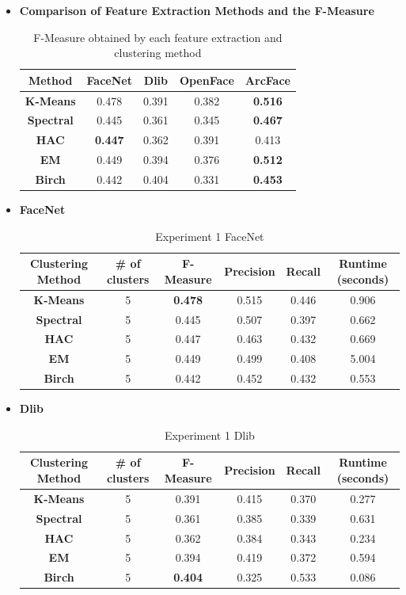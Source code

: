 \documentclass[12pt,english]{article}
\begin{document}
\begin{itemize}
\item \textbf{Comparison of Feature Extraction Methods and the F-Measure}
\begin{table}[H]
\centering
\begin{tabular}{||c c c c c||}
 \hline
Method & FaceNet & Dlib & OpenFace & ArcFace\\ [0.5ex]
 \hline\hline
 \textbf{K-Means} & 0.478 & 0.391 & 0.382 & \textbf{0.516}\\ 
 \hline
  \textbf{Spectral} & 0.445 & 0.361 & 0.345 & \textbf{0.467}\\
 \hline
 \textbf{HAC} & \textbf{0.447} & 0.362 & 0.391 & 0.413\\
 \hline
 \textbf{EM} & 0.449 & 0.394 & 0.376 & \textbf{0.512}\\
 \hline
 \textbf{Birch} & 0.442 & 0.404 & 0.331 & \textbf{0.453}\\
 \hline
\end{tabular}
\caption{F-Measure obtained by each feature extraction and clustering method}
\label{table:ex1}
\end{table}

\item \textbf{FaceNet}
\begin{table}[H]
\centering
\begin{tabular}{||c c c c c c||} 
 \hline
 Clustering Method & \# of clusters & F-Measure & Precision & Recall & Runtime (seconds)\\ [0.5ex]
 \hline\hline
 \textbf{K-Means} & 5 & \textbf{0.478} & 0.515 & 0.446 & 0.906\\ 
 \hline
  \textbf{Spectral} & 5 & 0.445 & 0.507 & 0.397 & 0.662\\
 \hline
 \textbf{HAC} & 5 & 0.447 & 0.463 & 0.432 & 0.669\\
 \hline
 \textbf{EM} & 5 & 0.449 & 0.499 & 0.408 & 5.004\\
 \hline
 \textbf{Birch} & 5 & 0.442 & 0.452 & 0.432 & 0.553\\
 \hline
\end{tabular}
\caption{Experiment 1 FaceNet}
\label{table:ex1facenet}
\end{table}
\item \textbf{Dlib}
\begin{table}[H]
\centering
\begin{tabular}{||c c c c c c||} 
 \hline
 Clustering Method & \# of clusters & F-Measure & Precision & Recall & Runtime (seconds)\\ [0.5ex]
 \hline\hline
 \textbf{K-Means} & 5 & 0.391 & 0.415 & 0.370 & 0.277\\ 
 \hline
  \textbf{Spectral} & 5 & 0.361 & 0.385 & 0.339 & 0.631\\
 \hline
 \textbf{HAC} & 5 & 0.362 & 0.384 & 0.343 & 0.234\\
 \hline
 \textbf{EM} & 5 & 0.394 & 0.419 & 0.372 & 0.594\\
 \hline
 \textbf{Birch} & 5 & \textbf{0.404} & 0.325 & 0.533 & 0.086\\
 \hline
\end{tabular}
\caption{Experiment 1 Dlib}
\label{table:ex1dlib}
\end{table}


\end{itemize}
\end{document}
